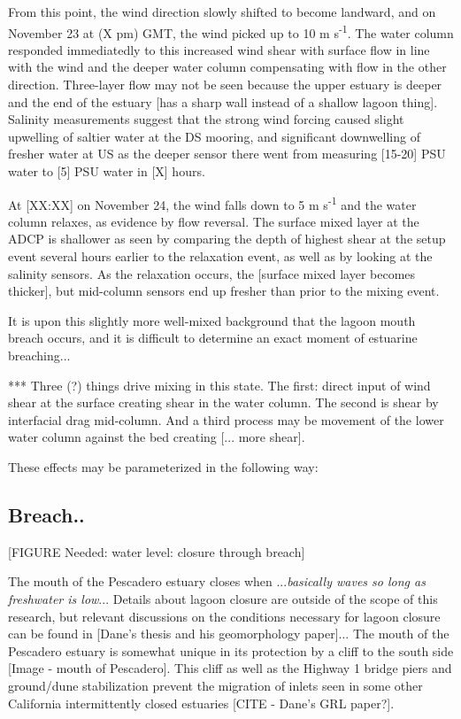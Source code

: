 From this point, the wind direction slowly shifted to become landward, and on November 23 at (X pm) GMT, the wind picked up to 10 m s\textsuperscript{-1}. The water column responded immediatedly to this increased wind shear with surface flow in line with the wind and the deeper water column compensating with flow in the other direction. Three-layer flow may not be seen because the upper estuary is deeper and the end of the estuary [has a sharp wall instead of a shallow lagoon thing]. Salinity measurements suggest that the strong wind forcing caused slight upwelling of saltier water at the DS mooring, and significant downwelling of fresher water at US as the deeper sensor there went from measuring [15-20] PSU water to [5] PSU water in [X] hours. 

At [XX:XX] on November 24, the wind falls down to 5 m s\textsuperscript{-1} and the water column relaxes, as evidence by flow reversal. The surface mixed layer at the ADCP is shallower as seen by comparing the depth of highest shear at the setup event several hours earlier to the relaxation event, as well as by looking at the salinity sensors. As the relaxation occurs, the [surface mixed layer becomes thicker], but mid-column sensors end up fresher than prior to the mixing event. 

It is upon this slightly more well-mixed background that the lagoon mouth breach occurs, and it is difficult to determine an exact moment of estuarine breaching...

***
Three (?) things drive mixing in this state. The first: direct input of wind shear at the surface creating shear in the water column.  The second is shear by interfacial drag mid-column. And a third process may be movement of the lower water column against the bed creating [... more shear]. 

These effects may be parameterized in the following way: 



\subsection{Breach.. }
\label{breach_dynamics}


[FIGURE Needed: water level: closure through breach]

The mouth of the Pescadero estuary closes when ...\emph{basically waves so long as freshwater is low}... Details about lagoon closure are outside of the scope of this research, but relevant discussions on the conditions necessary for lagoon closure can be found in [Dane's thesis and his geomorphology paper]... The mouth of the Pescadero estuary is somewhat unique in its protection by a cliff to the south side [Image - mouth of Pescadero]. This cliff as well as the Highway 1 bridge piers and {ground/dune stabilization} prevent the migration of inlets seen in some other California intermittently closed estuaries [CITE - Dane's GRL paper?]. 


